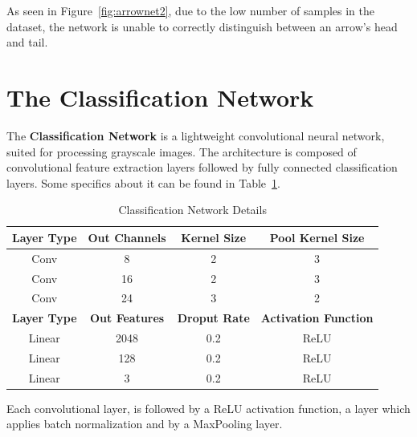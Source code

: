 \documentclass[conference]{IEEEtran}
\begin{document}
\begin{appendices}
As seen in Figure~\ref{fig:arrownet2}, due to the low number of samples in the dataset, the network is unable to correctly distinguish between an arrow's head and tail.

\section{The Classification Network}
\label{classification_net}

The \textbf{Classification Network} is a lightweight convolutional neural network, suited for processing grayscale images. The architecture is composed of convolutional feature extraction layers followed by fully connected classification layers. Some specifics about it can be found in Table~\ref{tab:classification-architecture}.

\begin{table}[h]
	\centering
	\caption{Classification Network Details}
	\label{tab:classification-architecture}
	\begin{tabular}{|c|c|c|c|}
		\hline
		\textbf{Layer Type} & \textbf{Out Channels} & \textbf{Kernel Size} & \textbf{Pool Kernel Size} \\
		\hline 
		Conv & 8 & 2 & 3 \\
		Conv & 16 & 2  & 3 \\
		Conv & 24 & 3  & 2 \\
		\hline
		\textbf{Layer Type} & \textbf{Out Features} & \textbf{Droput Rate} & \textbf{Activation Function} \\
		\hline 
		Linear & 2048 & 0.2 & ReLU \\
		Linear & 128 & 0.2 & ReLU \\
		Linear & 3 & 0.2 & ReLU \\
		\hline
	\end{tabular}
\end{table}

Each convolutional layer, is followed by a ReLU activation function, a layer which applies batch normalization and by a MaxPooling layer.

\end{appendices}
\end{document}
